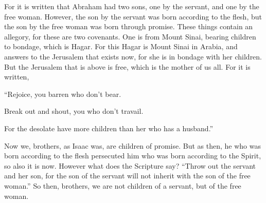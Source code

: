 {For it is written that Abraham had two sons, one by the servant, and one by the free woman.
However, the son by the servant was born according to the flesh, but the son by the free woman was born through promise.
These things contain an allegory, for these are two covenants. One is from Mount Sinai, bearing children to bondage, which is Hagar.
For this Hagar is Mount Sinai in Arabia, and answers to the Jerusalem that exists now, for she is in bondage with her children.
But the Jerusalem that is above is free, which is the mother of us all.
For it is written,
\par }{\Q “Rejoice, you barren who don’t bear.
\par }{\QB Break out and shout, you who don’t travail.
\par }{\QB For the desolate have more children than her who has a husband.”
\par }{\PP {}Now we, brothers, as Isaac was, are children of promise.
But as then, he who was born according to the flesh persecuted him who was born according to the Spirit, so also it is now.
However what does the Scripture say? “Throw out the servant and her son, for the son of the servant will not inherit with the son of the free woman.”
So then, brothers, we are not children of a servant, but of the free woman.

}

